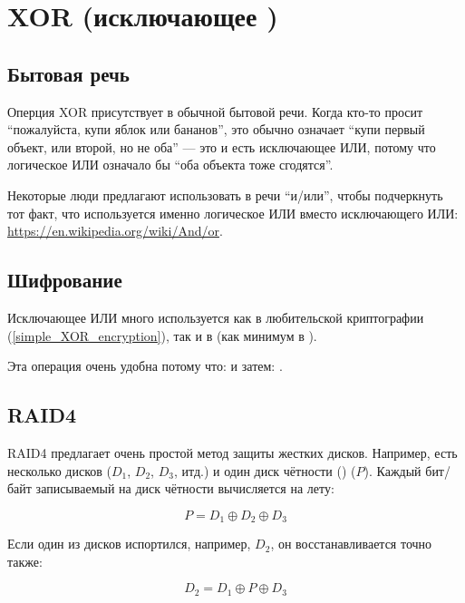 ﻿\section{XOR (исключающее )}
\label{XOR_property}



\subsection{Бытовая речь}

Оперция XOR присутствует в обычной бытовой речи.
Когда кто-то просит ``пожалуйста, купи яблок или бананов'',
это обычно означает ``купи первый объект, или второй, но не оба'' --- это и есть исключающее ИЛИ,
потому что логическое ИЛИ означало бы ``оба объекта тоже сгодятся''.

Некоторые люди предлагают использовать в речи ``и/или'', чтобы подчеркнуть тот факт, что используется именно логическое ИЛИ
вместо исключающего ИЛИ: \url{https://en.wikipedia.org/wiki/And/or}.

\subsection{Шифрование}

Исключающее ИЛИ много используется как в любительской криптографии (\ref{simple_XOR_encryption}), так и в 
(как минимум в ).

Эта операция очень удобна потому что:
 и затем:
.

\subsection{\ac{RAID}4}

\ac{RAID}4 предлагает очень простой метод защиты жестких дисков.
Например, есть несколько дисков ($D_1$, $D_2$, $D_3$, итд.) и один диск чётности () ($P$).
Каждый бит/байт записываемый на диск чётности вычисляется на лету:

\begin{equation} \label{eq:RAID4}
P = D_1 \oplus D_2 \oplus D_3
\end{equation}

Если один из дисков испортился, например, $D_2$, он восстанавливается точно также:

\begin{equation}
D_2 = D_1 \oplus P \oplus D_3
\end{equation}

